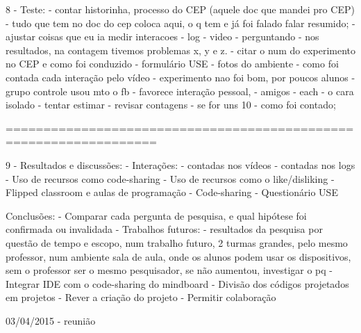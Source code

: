         8 - Teste:
            - contar historinha, processo do CEP (aquele doc que mandei pro CEP)
            - tudo que tem no doc do cep coloca aqui, o q tem e já foi falado falar resumido;
            - ajustar coisas que eu ia medir interacoes
                - log
                - video
                - perguntando
                - nos resultados, na contagem tivemos problemas x, y e z.
            - citar o num do experimento no CEP e como foi conduzido
            - formulário USE
            - fotos do ambiente
                - como foi contada cada interação pelo vídeo
            - experimento nao foi bom, por poucos alunos
                - grupo controle usou mto o fb
                - favorece interação pessoal,
                - amigos
                - each
                - o cara isolado
                - tentar estimar %
                    - revisar contagens - se for uns 10%
                - como foi contado;

        ==================================================================

        9 - Resultados e discussões:
            - Interações:
                - contadas nos vídeos
                - contadas nos logs
            - Uso de recursos como code-sharing
            - Uso de recursos como o like/disliking
            - Flipped classroom e aulas de programação
            - Code-sharing
            - Questionário USE

        Conclusões:
            - Comparar cada pergunta de pesquisa, e qual hipótese foi confirmada ou invalidada
            - Trabalhos futuros:
                - resultados da pesquisa por questão de tempo e escopo, num trabalho futuro, 2 turmas grandes, pelo mesmo professor, num ambiente sala de aula, onde os alunos podem usar os dispositivos, sem o professor ser o mesmo pesquisador, se não aumentou, investigar o pq
                - Integrar IDE com o code-sharing do mindboard
                - Divisão dos códigos projetados em projetos
                - Rever a criação do projeto
                - Permitir colaboração

        03/04/2015 - reunião


